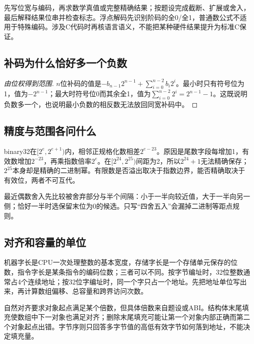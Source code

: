\begin{methodbox}[表示与运算题的统一路径]

先写位宽与编码，再求数学真值或完整精确结果；按题设完成截断、扩展或舍入，最后解释结果位串并检查标志。浮点解码先识别阶码的全0/全1，普通数公式不适用于特殊编码。涉及C代码时再核语言语义，不能把某种硬件结果提升为标准C保证。

\end{methodbox}

\subsection{补码为什么恰好多一个负数}\label{CO02-proof}

\begin{proof}[由位权得到范围]

\(n\)位补码的值是\(-b_{n-1}2^{n-1}+\sum_{i=0}^{n-2}b_i2^i\)。最小时只有符号位为1，值为\(-2^{n-1}\)；最大时符号位0而其余全1，值为\(\sum_{i=0}^{n-2}2^i=2^{n-1}-1\)。这既说明负数多一个，也说明最小负数的相反数无法放回同宽补码中。

\end{proof}

\subsection{精度与范围各问什么}\label{CO02-precision}

binary32在\([2^e,2^{e+1})\)内，相邻正规格化数相差\(2^{e-23}\)。原因是尾数字段每增加1，有效数增加\(2^{-23}\)，再乘指数倍率\(2^e\)。在\([2^{24},2^{25})\)间距为2，所以\(2^{24}+1\)无法精确保存；\(2^{25}\)本身却是精确的二进制幂。有限数是否溢出取决于指数边界，能否精确取决于有效位，两者不可互代。

最近偶数舍入先比较被舍弃部分与半个间隔：小于一半向较近值，大于一半向另一侧；恰好一半时选保留末位为0的候选。只写``四舍五入''会漏掉二进制等距点规则。

\subsection{对齐和容量的单位}\label{CO02-storage}

机器字长是CPU一次处理整数的基本宽度，存储字长是一个存储单元保存的位数，指令字长是某条指令的编码位数；三者可以不同。按字节编址时，32位整数通常占4个连续地址；按32位字编址时，同一个字只占一个地址。先把地址单位写出来，再计算数组偏移、总容量和跨界访问次数。

自然对齐要求对象起点满足某个倍数，但具体倍数来自题设或ABI。结构体末尾填充使数组中下一对象也满足对齐；删除末尾填充可能让第一个对象内部正确而第二个对象起点出错。字节序则只回答多字节值的高低有效字节如何落到地址，不能决定填充量。

